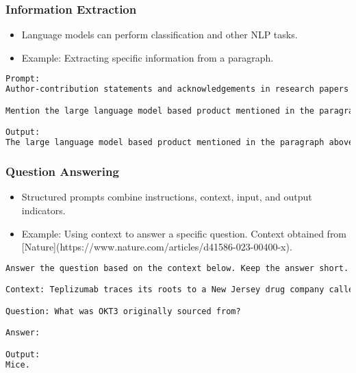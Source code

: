 \begin{frame}[fragile]\frametitle{Information Extraction}
\begin{itemize}
    \item Language models can perform classification and other NLP tasks.
    \item Example: Extracting specific information from a paragraph.
\end{itemize}
\begin{lstlisting}[language=HTML]
Prompt:
Author-contribution statements and acknowledgements in research papers should state clearly and specifically whether, and to what extent, the authors used AI technologies such as ChatGPT in the preparation of their manuscript and analysis. They should also indicate which LLMs were used. This will alert editors and reviewers to scrutinize manuscripts more carefully for potential biases, inaccuracies and improper source crediting. Likewise, scientific journals should be transparent about their use of LLMs, for example when selecting submitted manuscripts.

Mention the large language model based product mentioned in the paragraph above:

Output:
The large language model based product mentioned in the paragraph above is ChatGPT.
\end{lstlisting}
\end{frame}

\begin{frame}[fragile]\frametitle{Question Answering}
\begin{itemize}
    \item Structured prompts combine instructions, context, input, and output indicators.
    \item Example: Using context to answer a specific question. Context obtained from [Nature](https://www.nature.com/articles/d41586-023-00400-x).
\end{itemize}
\begin{lstlisting}[language=HTML]
Answer the question based on the context below. Keep the answer short. Respond "Unsure about answer" if not sure about the answer.

Context: Teplizumab traces its roots to a New Jersey drug company called Ortho Pharmaceutical. There, scientists generated an early version of the antibody, dubbed OKT3. Originally sourced from mice, the molecule was able to bind to the surface of T cells and limit their cell-killing potential. In 1986, it was approved to help prevent organ rejection after kidney transplants, making it the first therapeutic antibody allowed for human use.

Question: What was OKT3 originally sourced from?

Answer:

Output:
Mice.
\end{lstlisting}
\end{frame}

